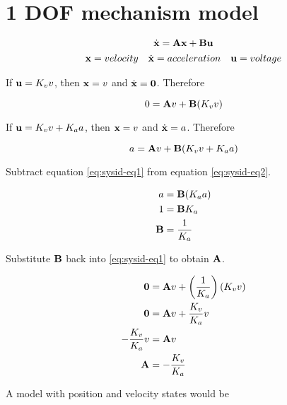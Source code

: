 \section{1 DOF mechanism model}

\begin{equation*}
  \dot{\mathbf{x}} = \mathbf{A}\mathbf{x} + \mathbf{B}\mathbf{u}
\end{equation*}
\begin{equation*}
  \begin{array}{ccc}
    \mathbf{x} = velocity & \dot{\mathbf{x}} = acceleration & \mathbf{u} = voltage
  \end{array}
\end{equation*}

If $\mathbf{u} = K_v v$, then $\mathbf{x} = v$ and $\dot{\mathbf{x}} = \mathbf{0}$.
Therefore

\begin{equation}
  0 = \mathbf{A}v + \mathbf{B}(K_v v) \label{eq:sysid-eq1}
\end{equation}

If $\mathbf{u} = K_v v + K_a a$, then $\mathbf{x} = v$ and $\dot{\mathbf{x}} = a$.
Therefore

\begin{equation}
  a = \mathbf{A}v + \mathbf{B}(K_v v + K_a a) \label{eq:sysid-eq2}
\end{equation}

Subtract equation \eqref{eq:sysid-eq1} from equation \eqref{eq:sysid-eq2}.

\begin{align*}
  a &= \mathbf{B} (K_a a) \\
  1 &= \mathbf{B} K_a \\
  \mathbf{B} &= \frac{1}{K_a}
\end{align*}

Substitute $\mathbf{B}$ back into \eqref{eq:sysid-eq1} to obtain $\mathbf{A}$.

\begin{align*}
  \mathbf{0} &= \mathbf{A}v + \left(\frac{1}{K_a}\right)(K_v v) \\
  \mathbf{0} &= \mathbf{A}v + \frac{K_v}{K_a} v \\
  -\frac{K_v}{K_a} v &= \mathbf{A}v \\
  \mathbf{A} &= -\frac{K_v}{K_a}
\end{align*}

A model with position and velocity states would be

